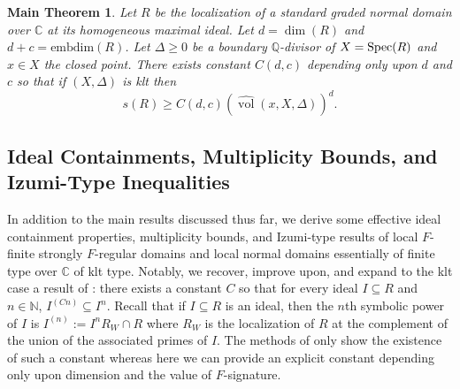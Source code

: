 \documentclass[12pt]{amsart}
\numberwithin{equation}{theorem}
\theoremstyle{plain}
\newtheorem{maintheorem}{Main Theorem}
\DeclareMathOperator{\vol}{vol}
\newcommand{\QQ}{\mathbb{Q}}
\newcommand{\CC}{\mathbb{C}}
\newcommand{\NN}{\mathbb{N}}
\begin{document}
\begin{maintheorem}
    \label{mainthm: F-sig lower bound via normalized volume}
    Let $R$ be the localization of a standard graded normal domain over $\CC$ at its homogeneous maximal ideal. Let $d=\dim(R)$ and $d+c = \text{embdim}(R)$. Let $\Delta\geq 0$ be a boundary $\QQ$-divisor of $X = \operatorname{{Spec}}(R)$ and $x\in X$ the closed point. There exists constant $C(d,c)$ depending only upon $d$ and $c$ so that if $(X,\Delta)$ is klt then
    \[
    s(R) \geq C(d,c)\left(\widehat{\vol}(x,X,\Delta)\right)^d.
    \]
\end{maintheorem}





\subsection{Ideal Containments, Multiplicity Bounds, and Izumi-Type Inequalities}

In addition to the main results discussed thus far, we derive some effective ideal containment properties, multiplicity bounds, and Izumi-type results of local $F$-finite strongly $F$-regular domains and local normal domains essentially of finite type over $\CC$ of klt type. Notably, we recover, improve upon, and expand to the klt case a result of \cite{PolstraUSTP}: there exists a constant $C$ so that for every ideal $I\subseteq R$ and $n\in\NN$, $I^{(Cn)}\subseteq I^n$. Recall that if $I\subseteq R$ is an ideal, then the $n$th symbolic power of $I$ is $I^{(n)}:= I^nR_W\cap R$ where $R_W$ is the localization of $R$ at the complement of the union of the associated primes of $I$. The methods of \cite{PolstraUSTP} only show the existence of such a constant whereas here we can provide an explicit constant depending only upon dimension and the value of $F$-signature. 
\end{document}
